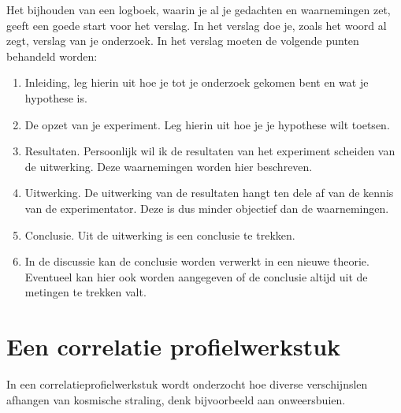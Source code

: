 Het bijhouden van een logboek, waarin je al je gedachten en waarnemingen
zet, geeft een goede start voor het verslag. In het verslag doe je,
zoals het woord al zegt, verslag van je onderzoek. In het verslag
moeten de volgende punten behandeld worden:
\begin{enumerate}
\item Inleiding, leg hierin uit hoe je tot je onderzoek gekomen bent en
wat je hypothese is.
\item De opzet van je experiment. Leg hierin uit hoe je je hypothese wilt
toetsen.
\item Resultaten. Persoonlijk wil ik de resultaten van het experiment scheiden
van de uitwerking. Deze waarnemingen worden hier beschreven.
\item Uitwerking. De uitwerking van de resultaten hangt ten dele af van
de kennis van de experimentator. Deze is dus minder objectief dan
de waarnemingen.
\item Conclusie. Uit de uitwerking is een conclusie te trekken.
\item In de discussie kan de conclusie worden verwerkt in een nieuwe theorie.
Eventueel kan hier ook worden aangegeven of de conclusie altijd uit
de metingen te trekken valt.
\end{enumerate}

\section{Een correlatie profielwerkstuk}

In een correlatieprofielwerkstuk wordt onderzocht hoe diverse verschijnslen
afhangen van kosmische straling, denk bijvoorbeeld aan onweersbuien.


